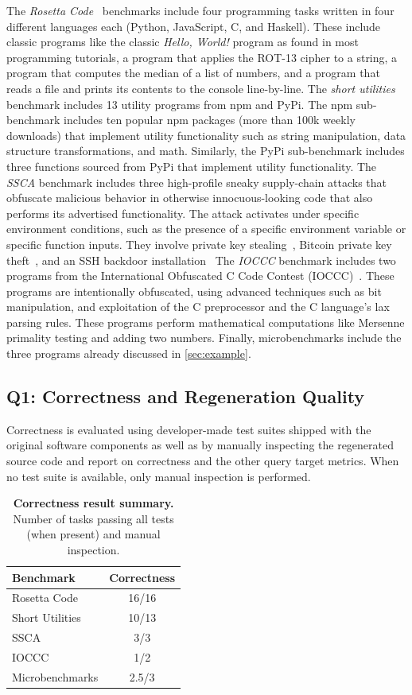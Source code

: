 \documentclass[nonacm,sigplan,review]{acmart}
\begin{document}
The \textit{Rosetta Code}~\cite{rosettacode} benchmarks include four programming tasks written in four different
languages each (Python, JavaScript, C, and Haskell). 
These include classic programs like
the classic \emph{Hello, World!} program as found in most programming tutorials,
a program that applies the ROT-13 cipher to a string,
a program that computes the median of a list of numbers,
and a program that reads a file and prints its contents to the console line-by-line.
The \textit{short utilities} benchmark includes 13 utility programs from npm and PyPi.
The npm sub-benchmark includes ten popular npm packages (more than 100k weekly downloads) that implement utility
functionality such as string manipulation, data structure transformations, and math.
Similarly, the PyPi sub-benchmark includes three functions sourced from PyPi that implement utility functionality.
The \textit{SSCA} benchmark includes three high-profile sneaky supply-chain attacks that obfuscate malicious behavior in otherwise innocuous-looking code that also performs its advertised functionality.
The attack activates under specific environment conditions, such as the presence of a specific environment variable or specific function inputs.
They involve private key stealing~\cite{ohm2020backstabber}, Bitcoin private key theft~\cite{ev:eurosec:2022}, and an SSH backdoor installation~\cite{copeland2019frightening}
The \textit{IOCCC} benchmark includes two programs from the International Obfuscated C Code Contest (IOCCC)~\cite{ioccc}.
These programs are intentionally obfuscated, using advanced techniques such as bit manipulation,
and exploitation of the C preprocessor and the C language's lax parsing rules.
These programs perform mathematical computations like Mersenne primality testing and adding two numbers.
Finally, microbenchmarks include the three programs already discussed in \cref{sec:example}.

\subsection{Q1: Correctness and Regeneration Quality}

Correctness is evaluated using developer-made test suites 
shipped with the original software components as well as by manually inspecting
the regenerated source code and report on correctness and the other query target metrics.
When no test suite is available, only manual inspection is performed.

\begin{table}[htpb]
  \centering
  \caption{\textbf{Correctness result summary.} Number of tasks passing all tests (when present) and manual inspection.}
  \begin{tabular}{lc}
    \toprule
    Benchmark & Correctness \\ 
    \midrule
    Rosetta Code & 16/16  \\
    Short Utilities & 10/13 \\
    SSCA & 3/3  \\
    IOCCC & 1/2 \\
    Microbenchmarks & 2.5/3  \\
    \bottomrule
  \end{tabular}
\end{table}
\end{document}
